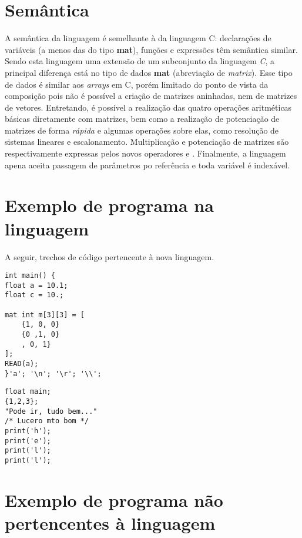 \documentclass[
	article,			%
	11pt,				%
	oneside,			%
	a4paper,			%
	english,			%
	brazil,				%
	sumario=tradicional
	]{abntex2}
\renewcommand{\it}[1]{\textit{#1}}
\renewcommand{\bf}[1]{\textbf{#1}}
\begin{document}




\section{Semântica}
A semântica da linguagem é semelhante à da linguagem C: declarações de variáveis (a menos das do tipo \bf{mat}), funções e expressões têm semântica similar. Sendo esta linguagem uma extensão de um subconjunto da linguagem \it{C}, a principal diferença está no tipo de dados \bf{mat} (abreviação de \it{matrix}). Esse tipo de dados é similar aos \it{arrays} em C, porém limitado do ponto de vista da composição pois não é possível a criação de matrizes aninhadas, nem de matrizes de vetores. Entretando, é possível a realização das quatro operações aritméticas básicas diretamente com matrizes, bem como a realização de potenciação de matrizes de forma \it{rápida} e algumas operações sobre elas, como resolução de sistemas lineares e escalonamento. Multiplicação e potenciação de matrizes são respectivamente expressas pelos novos operadores  e . Finalmente, a linguagem apena aceita passagem de parâmetros po referência e toda variável é indexável.

\section{Exemplo de programa na linguagem}
A seguir, trechos de código pertencente à nova linguagem.

\begin{lstlisting}[style=CStyle]
int main() {
float a = 10.1;
float c = 10.;

mat int m[3][3] = [
	{1, 0, 0} 
	{0 ,1, 0} 
	, 0, 1}
];
READ(a);
}'a'; '\n'; '\r'; '\\';
\end{lstlisting}

\begin{lstlisting}[style=CStyle]
float main;
{1,2,3};
"Pode ir, tudo bem..."
/* Lucero mto bom */
print('h');
print('e');
print('l');
print('l');
\end{lstlisting}

\section{Exemplo de programa não pertencentes à linguagem}
\end{document}
